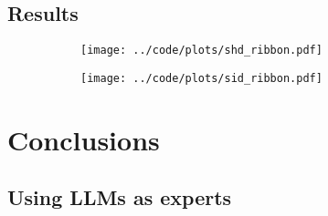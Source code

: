 \documentclass[letterpaper]{article} %
\begin{document}
\subsection{Results}
\begin{figure}
	\begin{subfigure}{0.5\textwidth}
		\texttt{[image: ../code/plots/shd\_ribbon.pdf]}
	\end{subfigure}
	\begin{subfigure}{0.5\textwidth}
		\texttt{[image: ../code/plots/sid\_ribbon.pdf]}
	\end{subfigure}
\end{figure}

\section{Conclusions}
\subsection{Using LLMs as experts}


\end{document}
